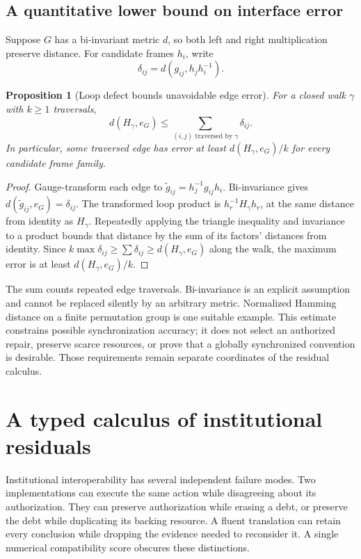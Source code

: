 \documentclass[11pt,letterpaper]{article}
\theoremstyle{plain}
\newtheorem{proposition}{Proposition}[section]
\theoremstyle{definition}
\theoremstyle{remark}
\begin{document}
\subsection{A quantitative lower bound on interface error}
Suppose $G$ has a bi-invariant metric $d$, so both left and right multiplication preserve distance. For candidate frames $h_i$, write
\[
\delta_{ij}=d(g_{ij},h_jh_i^{-1}).
\]
\begin{proposition}[Loop defect bounds unavoidable edge error]\label{prop:holonomybound}
For a closed walk $\gamma$ with $k\ge1$ traversals,
\[
d(H_\gamma,e_G)\le\sum_{(i,j)\text{ traversed by }\gamma}\delta_{ij}.
\]
In particular, some traversed edge has error at least $d(H_\gamma,e_G)/k$ for every candidate frame family.
\end{proposition}
\begin{proof}
Gauge-transform each edge to $\widetilde g_{ij}=h_j^{-1}g_{ij}h_i$. Bi-invariance gives $d(\widetilde g_{ij},e_G)=\delta_{ij}$. The transformed loop product is $h_r^{-1}H_\gamma h_r$, at the same distance from identity as $H_\gamma$. Repeatedly applying the triangle inequality and invariance to a product bounds that distance by the sum of its factors' distances from identity. Since $k\max\delta_{ij}\ge\sum\delta_{ij}\ge d(H_\gamma,e_G)$ along the walk, the maximum error is at least $d(H_\gamma,e_G)/k$.
\end{proof}

The sum counts repeated edge traversals. Bi-invariance is an explicit assumption and cannot be replaced silently by an arbitrary metric. Normalized Hamming distance on a finite permutation group is one suitable example. This estimate constrains possible synchronization accuracy; it does not select an authorized repair, preserve scarce resources, or prove that a globally synchronized convention is desirable. Those requirements remain separate coordinates of the residual calculus.

\section{A typed calculus of institutional residuals}\label{sec:residuals}
Institutional interoperability has several independent failure modes. Two implementations can execute the same action while disagreeing about its authorization. They can preserve authorization while erasing a debt, or preserve the debt while duplicating its backing resource. A fluent translation can retain every conclusion while dropping the evidence needed to reconsider it. A single numerical compatibility score obscures these distinctions.
\end{document}
